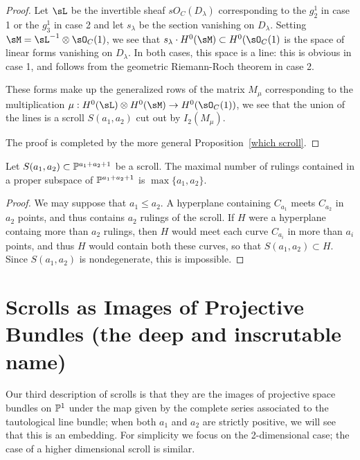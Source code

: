 \begin{proof}
Let $\sL$ be the invertible sheaf $sO_C(D_\lambda)$ corresponding to the $g^1_2$ in case 1 or
the $g_3^1$ in case 2 and let $s_\lambda$ be
the section vanishing on $D_\lambda$. Setting $\sM =  \sL^{-1}\otimes \sO_C(1)$, we see that
$s_\lambda\cdot H^0(\sM) \subset H^0(\sO_C(1)$ is the space of linear forms vanishing on
$D_\lambda$. In both cases, this space is a line: this is obvious in case 1, and follows from the 
geometric Riemann-Roch theorem in case 2. 

These forms make up the
generalized rows of the matrix $M_\mu$ corresponding to the multiplication
$\mu: H^0(\sL)\otimes H^0(\sM) \to H^0(\sO_C(	1))$, we see that the union of the lines is a
scroll $S(a_1,a_2)$ cut out by $I_2(M_\mu)$.

The proof is completed by the more general Proposition~\ref{which scroll}.
\end{proof}

\begin{proposition}\label{which scroll}
Let $S(a_1,a_2)\subset \PP^{a_1+a_2+1}$ be a scroll. The maximal number of rulings contained in
a proper subspace of $ \PP^{a_1+a_2+1}$ is $\max\{a_1,a_2\}$.
\end{proposition}

\begin{proof}
We may suppose that $a_1\leq a_2$. A hyperplane containing $C_{a_1}$ meets $C_{a_2}$ in $a_2$
points, and thus contains $a_2$ rulings of the scroll. If $H$ were a hyperplane containg more than $a_2$
rulings, then $H$ would meet each curve $C_{a_i}$ in more than $a_i$ points, and thus $H$ would contain
both these curves, so that $S(a_1,a_2)\subset H$. Since $S(a_1,a_2)$ is nondegenerate, this is impossible.
\end{proof}


\section{Scrolls as Images of Projective Bundles (the deep and inscrutable name)}\label{inscrutable name}

Our third description of scrolls is that they are the images of projective space bundles on $\PP^{1}$ under the map given by the complete series associated to the tautological line bundle; when both $a_{1}$ and $a_{2}$ are strictly positive, we will see that this is an embedding. For simplicity we focus on the 2-dimensional case; the case of a higher dimensional scroll is similar. 

